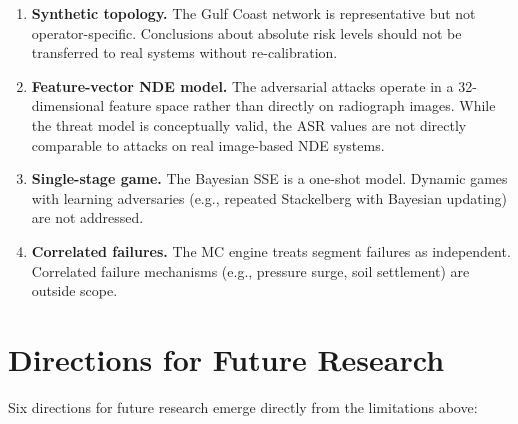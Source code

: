 \begin{enumerate}
  \item \textbf{Synthetic topology.}  The Gulf Coast network is
    representative but not operator-specific.  Conclusions about
    absolute risk levels should not be transferred to real systems
    without re-calibration.

  \item \textbf{Feature-vector NDE model.}  The adversarial attacks
    operate in a 32-dimensional feature space rather than directly
    on radiograph images.  While the threat model is conceptually
    valid, the ASR values are not directly comparable to attacks on
    real image-based NDE systems.

  \item \textbf{Single-stage game.}  The Bayesian SSE is a one-shot
    model.  Dynamic games with learning adversaries (e.g., repeated
    Stackelberg with Bayesian updating) are not addressed.

  \item \textbf{Correlated failures.}  The \ac{MC} engine treats
    segment failures as independent.  Correlated failure mechanisms
    (e.g., pressure surge, soil settlement) are outside scope.
\end{enumerate}

\section{Directions for Future Research}
\label{sec:conclusion_future}

Six directions for future research emerge directly from the
limitations above:

